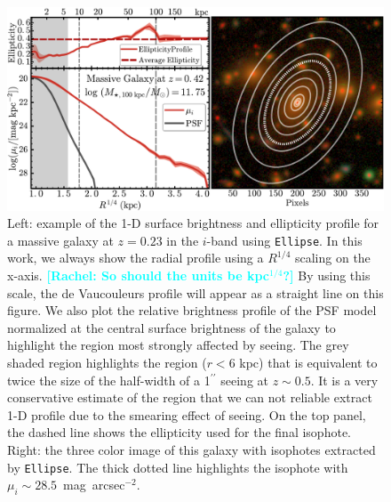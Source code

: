 \documentclass[a4paper,fleqn,usenatbib]{mnras}
\def\asec{$^{\prime\prime}$}
\def\sb{mag~arcsec$^{-2}$}
\newcommand{\rachel}[1]{\textcolor{cyan}{\textbf{[Rachel: #1]}}}
\begin{document}
    \begin{figure}
        \centering 
        \includegraphics[width=\textwidth]{fig/redbcg_ellipse_example}
        \caption{
            Left: example of the 1-D surface brightness and ellipticity profile 
            for a massive galaxy at $z=0.23$ in the $i$-band using \texttt{Ellipse}. 
            In this work, we always show the radial profile using a $R^{1/4}$ scaling 
            on the x-axis. \rachel{So should the units be kpc$^{1/4}$?}
            By using this scale, the de Vaucouleurs profile will appear as a straight 
            line on this figure.  
            We also plot the relative brightness profile of the PSF model normalized 
            at the central surface brightness of the galaxy to highlight the region 
            most strongly affected by seeing.
            The grey shaded region highlights the region ($r<6$ kpc) that is equivalent 
            to twice the size of the half-width of a 1\asec{} seeing at $z\sim 0.5$.
            It is a very conservative estimate of the region that we can not reliable 
            extract 1-D profile due to the smearing effect of seeing.
            On the top panel, the dashed line shows the ellipticity used for the final 
            isophote. 
            Right: the three color image of this galaxy with isophotes 
            extracted by \texttt{Ellipse}. 
            The thick dotted line highlights the isophote with 
            $\mu_{i}{\sim} 28.5$~\sb.
            }
        \label{fig:ellipse}
    \end{figure}

\end{document}
